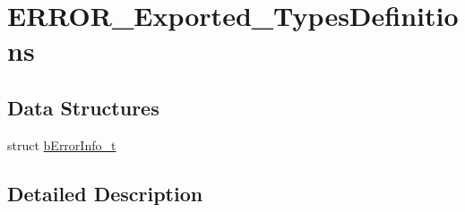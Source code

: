 \hypertarget{group___e_r_r_o_r___exported___types_definitions}{}\section{E\+R\+R\+O\+R\+\_\+\+Exported\+\_\+\+Types\+Definitions}
\label{group___e_r_r_o_r___exported___types_definitions}
\subsection*{Data Structures}
\begin{DoxyCompactItemize}
\item 
struct \mbox{\hyperlink{structb_error_info__t}{b\+Error\+Info\+\_\+t}}
\end{DoxyCompactItemize}


\subsection{Detailed Description}
